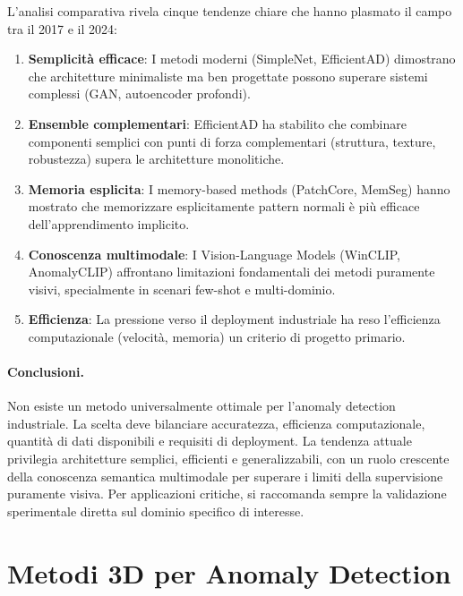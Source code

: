 L'analisi comparativa rivela cinque tendenze chiare che hanno plasmato il campo tra il 2017 e il 2024:

\begin{enumerate}
    \item \textbf{Semplicità efficace}: I metodi moderni (SimpleNet, EfficientAD) dimostrano che architetture minimaliste ma ben progettate possono superare sistemi complessi (GAN, autoencoder profondi).

    \item \textbf{Ensemble complementari}: EfficientAD ha stabilito che combinare componenti semplici con punti di forza complementari (struttura, texture, robustezza) supera le architetture monolitiche.

    \item \textbf{Memoria esplicita}: I memory-based methods (PatchCore, MemSeg) hanno mostrato che memorizzare esplicitamente pattern normali è più efficace dell'apprendimento implicito.

    \item \textbf{Conoscenza multimodale}: I Vision-Language Models (WinCLIP, A\-no\-ma\-ly\-CLIP) affrontano limitazioni fondamentali dei metodi puramente visivi, specialmente in scenari few-shot e multi-dominio.

    \item \textbf{Efficienza}: La pressione verso il deployment industriale ha reso l'efficienza computazionale (velocità, memoria) un criterio di progetto primario.
\end{enumerate}


\paragraph{Conclusioni.} Non esiste un metodo universalmente ottimale per l'anomaly detection industriale. La scelta deve bilanciare accuratezza, efficienza computazionale, quantità di dati disponibili e requisiti di deployment. La tendenza attuale privilegia architetture semplici, efficienti e generalizzabili, con un ruolo crescente della conoscenza semantica multimodale per superare i limiti della supervisione puramente visiva. Per applicazioni critiche, si raccomanda sempre la validazione sperimentale diretta sul dominio specifico di interesse.


\section{Metodi 3D per Anomaly Detection}
\label{sec:metodi-3d}


